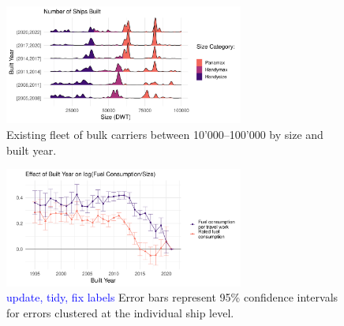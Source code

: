 \documentclass[hidelinks, 12pt,letterpaper]{article}
\begin{document}
\begin{figure}[h]
  \centering
  \includegraphics[width = 0.7\textwidth]{WFR_Bulkers_Exploration_Size_Built_horizontalridges.png}
  \caption{Existing fleet of bulk carriers between 10'000--100'000 by size and built year.}
  \label{fig:distribution}
\end{figure} 
\begin{figure}[h]
  \centering

  \includegraphics[width = 0.7\textwidth]{Efficiency_Regression_Size_Built_coefs_1and3_ggplot.png}
  \caption{\textcolor{blue}{update, tidy, fix labels} Error bars represent 95\% confidence intervals for errors clustered at the individual ship level.}
  \label{fig:efficiency}
\end{figure} 


 
 
\end{document}
